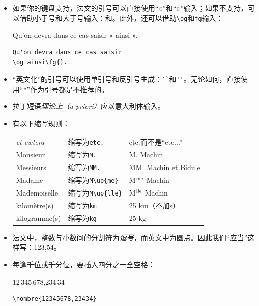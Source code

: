 \begin{itemize}
    \item 如果你的键盘支持，法文的引号可以直接使用“«”和“»”输入；如果不支持，可以借助小于号和大于号输入：\dm{<<}和\dm{>>}。此外，还可以借助\verb|\og|和\verb|fg|输入：
    
    \begin{codelist}[7.3]{
        Qu'on devra dans ce cas saisir « ainsi ».
    }
\begin{verbatim}
Qu'on devra dans ce cas saisir
\og ainsi\fg{}.
    \end{verbatim}
    \end{codelist}

    \item “英文化”的引号可以使用单引号和反引号生成：\verb|``|和\verb|''|。无论如何，直接使用“\verb|"|”作为引号都是不推荐的。
    
    \item 拉丁短语\emph{理论上（a priori）}应以意大利体输入。
    
    \item 有以下缩写规则：

    \begin{center}
        \begin{tabular}{|l|l|l|}
            \hline
            \emph{et cætera} & 缩写为\quad \verb|etc.| & etc.而不是“etc...” \\
            Monsieur & 缩写为\quad \verb|M.| & M. Machin \\
            Messieurs & 缩写为\quad \verb|MM.| & MM. Machin et Bidule\\
            Madame & 缩写为\quad \verb|M\up{me}| & M$^{\rm me}$ Machin\\
            Mademoiselle & 缩写为\quad \verb|M\up{lle}| & M$^{\rm lle}$ Machin\\
            kilomètre(s) & 缩写为\quad \verb|km| & 25 km（不加s）\\
            kilogramme(s) & 缩写为\quad \verb|kg| & 25 kg\\
            \hline
        \end{tabular}
    \end{center}

    \item 法文中，整数与小数间的分割符为\emph{逗号}，而英文中为圆点。因此我们“应当”这样写：123,54。
    
    \item 每逢千位或千分位，要插入四分之一全空格：
    \begin{codelist}[7.4]{
        12\,345\,678,234\,34
    }
\begin{verbatim}
\nombre{12345678,23434}
    \end{verbatim}
    \end{codelist}


\end{itemize}
